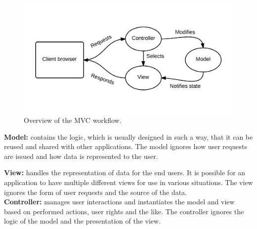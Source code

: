 \begin{figure}[ht]
\includegraphics[width=\textwidth]{img/mvc.png}
\caption{Overview of the MVC workflow.}
\label{fig:mvc}
\end{figure}

\textbf{Model:} contains the logic, which is usually designed in such a way, that it can be reused and shared with other applications.
The model ignores how user requests are issued and how data is represented to the user.\newline

\textbf{View:} handles the representation of data for the end users.
It is possible for an application to have multiple different views for use in various situations.
The view ignores the form of user requests and the source of the data.\\

\textbf{Controller:} manages user interactions and instantiates the model and view based on performed actions, user rights and the like.
The controller ignores the logic of the model and the presentation of the view.

